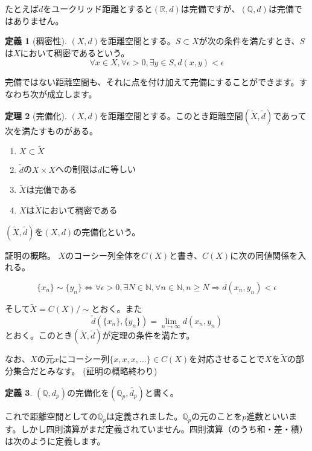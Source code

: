 \documentclass[uplatex]{jsarticle}
\newcommand{\Q}{\mathbb{Q}}
\newcommand{\R}{\mathbb{R}}
\theoremstyle{definition} %
\newtheorem{thm}{定理}
\newtheorem{defi}[thm]{定義}
\begin{document}
たとえば$d$をユークリッド距離とすると$(\R, d)$は完備ですが、$(\Q, d)$は完備ではありません。

\begin{oframed}\begin{defi}[稠密性]
$(X, d)$を距離空間とする。$S \subset X$が次の条件を満たすとき、$S$は$X$において稠密であるという。
\[
\forall x \in X, \forall \epsilon > 0, \exists y \in S, d(x, y) < \epsilon
\]
\end{defi}\end{oframed}

完備ではない距離空間も、それに点を付け加えて完備にすることができます。すなわち次が成立します。

\begin{oframed}\begin{thm}[完備化]
$(X, d)$を距離空間とする。このとき距離空間$(\tilde{X}, \tilde{d})$であって次を満たすものがある。
\begin{enumerate}
\item $X \subset \tilde{X}$
\item $\tilde{d}$の$X \times X$への制限は$d$に等しい
\item $\tilde{X}$は完備である
\item $X$は$\tilde{X}$において稠密である
\end{enumerate}
$(\tilde{X}, \tilde{d})$を$(X,d)$の完備化という。
\end{thm}\end{oframed}
\noindent 証明の概略。
$X$のコーシー列全体を$C(X)$と書き、$C(X)$に次の同値関係を入れる。

\[\{x_n\} \sim \{y_n\} \iff \forall \epsilon > 0, \exists N \in \mathbb{N}, \forall n \in \mathbb{N}, n \geq N \Rightarrow d(x_n, y_n) < \epsilon\]

そして$\tilde{X} = C(X)/{\sim}$とおく。また
\[\tilde{d}(\{x_n\}, \{y_n\}) = \lim_{n\to\infty} d(x_n, y_n)\]
とおく。このとき$(\tilde{X}, \tilde{d})$が定理の条件を満たす。 

なお、$X$の元$x$にコーシー列$\{x, x, x, \dots\} \in C(X)$を対応させることで$X$を$\tilde{X}$の部分集合だとみなす。 (証明の概略終わり)

\begin{oframed}\begin{defi}
$(\Q, d_p)$の完備化を$(\Q_p, \tilde{d_p})$と書く。
\end{defi}\end{oframed}

これで距離空間としての$\Q_p$は定義されました。$\Q_p$の元のことを$p$進数といいます。しかし四則演算がまだ定義されていません。四則演算（のうち和・差・積）は次のように定義します。
\end{document}
